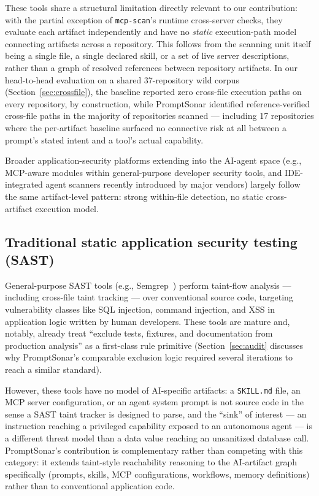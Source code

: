 \documentclass[sigconf,anonymous,review]{acmart}
\newcommand{\sysname}{PromptSonar}
\begin{document}
These tools share a structural limitation directly relevant to our contribution: with the partial exception of \texttt{mcp-scan}'s runtime cross-server checks, they evaluate each artifact independently and have no \emph{static} execution-path model connecting artifacts across a repository. This follows from the scanning unit itself being a single file, a single declared skill, or a set of live server descriptions, rather than a graph of resolved references between repository artifacts. In our head-to-head evaluation on a shared 37-repository wild corpus (Section~\ref{sec:crossfile}), the baseline reported zero cross-file execution paths on every repository, by construction, while \sysname{} identified reference-verified cross-file paths in the majority of repositories scanned --- including 17 repositories where the per-artifact baseline surfaced no connective risk at all between a prompt's stated intent and a tool's actual capability.

Broader application-security platforms extending into the AI-agent space (e.g., MCP-aware modules within general-purpose developer security tools, and IDE-integrated agent scanners recently introduced by major vendors) largely follow the same artifact-level pattern: strong within-file detection, no static cross-artifact execution model.

\subsection{Traditional static application security testing (SAST)}
General-purpose SAST tools (e.g., Semgrep~\cite{semgrep}) perform taint-flow analysis --- including cross-file taint tracking --- over conventional source code, targeting vulnerability classes like SQL injection, command injection, and XSS in application logic written by human developers. These tools are mature and, notably, already treat ``exclude tests, fixtures, and documentation from production analysis'' as a first-class rule primitive (Section~\ref{sec:audit} discusses why \sysname{}'s comparable exclusion logic required several iterations to reach a similar standard).

However, these tools have no model of AI-specific artifacts: a \texttt{SKILL.md} file, an MCP server configuration, or an agent system prompt is not source code in the sense a SAST taint tracker is designed to parse, and the ``sink'' of interest --- an instruction reaching a privileged capability exposed to an autonomous agent --- is a different threat model than a data value reaching an unsanitized database call. \sysname{}'s contribution is complementary rather than competing with this category: it extends taint-style reachability reasoning to the AI-artifact graph specifically (prompts, skills, MCP configurations, workflows, memory definitions) rather than to conventional application code.
\end{document}
